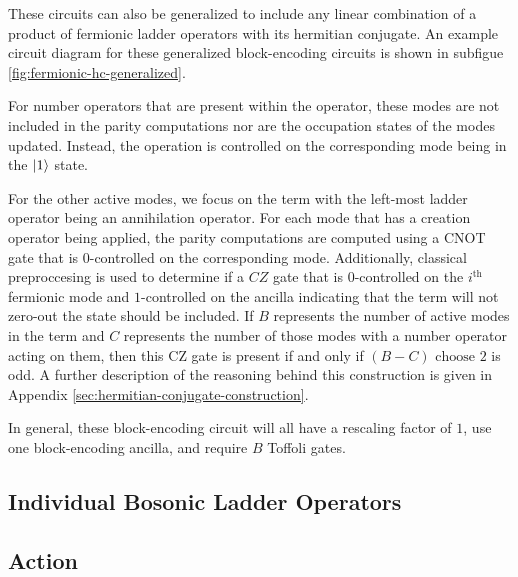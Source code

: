 These circuits can also be generalized to include any linear combination of a product of fermionic ladder operators with its hermitian conjugate. 
An example circuit diagram for these generalized block-encoding circuits is shown in subfigue \ref{fig:fermionic-hc-generalized}.

For number operators that are present within the operator, these modes are not included in the parity computations nor are the occupation states of the modes updated.
Instead, the operation is controlled on the corresponding mode being in the $\ket{1}$ state.

For the other active modes, we focus on the term with the left-most ladder operator being an annihilation operator.
For each mode that has a creation operator being applied, the parity computations are computed using a CNOT gate that is $0$-controlled on the corresponding mode.
Additionally, classical preproccesing is used to determine if a $CZ$ gate that is $0$-controlled on the $i^\text{th}$ fermionic mode and $1$-controlled on the ancilla indicating that the term will not zero-out the state should be included.
If $B$ represents the number of active modes in the term and $C$ represents the number of those modes with a number operator acting on them, then this CZ gate is present if and only if $(B - C) \text{ choose } 2$ is odd.
A further description of the reasoning behind this construction is given in Appendix \ref{sec:hermitian-conjugate-construction}.

In general, these block-encoding circuit will all have a rescaling factor of $1$, use one block-encoding ancilla, and require $B$ Toffoli gates.

\subsection{Individual Bosonic Ladder Operators}


\subsection{Action}


